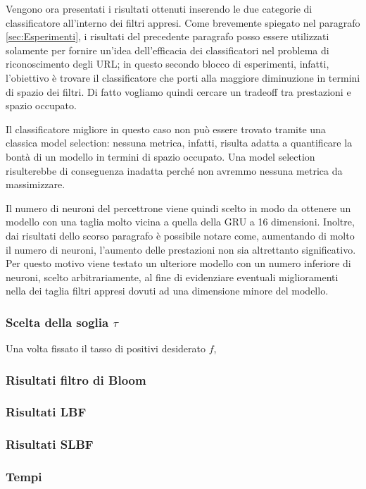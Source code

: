 \documentclass[../../main.tex]{subfiles}
\begin{document}
    Vengono ora presentati i risultati ottenuti inserendo le due categorie di classificatore all'interno dei filtri appresi. Come brevemente spiegato nel paragrafo \ref{sec:Esperimenti}, i risultati del precedente paragrafo posso essere utilizzati solamente per fornire un'idea dell'efficacia dei classificatori nel problema di riconoscimento degli URL; in questo secondo blocco di esperimenti, infatti, l'obiettivo è trovare il classificatore che porti alla maggiore diminuzione in termini di spazio dei filtri. Di fatto vogliamo quindi cercare un tradeoff tra prestazioni e spazio occupato.

    Il classificatore migliore in questo caso non può essere trovato tramite una classica model selection: nessuna metrica, infatti, risulta adatta a quantificare la bontà di un modello in termini di spazio occupato. Una model selection risulterebbe di conseguenza inadatta perché non avremmo nessuna metrica da massimizzare.

    Il numero di neuroni del percettrone viene quindi scelto in modo da ottenere un modello con una taglia molto vicina a quella della GRU a 16 dimensioni. Inoltre, dai risultati dello scorso paragrafo è possibile notare come, aumentando di molto il numero di neuroni, l'aumento delle prestazioni non sia altrettanto significativo. Per questo motivo viene testato un ulteriore modello con un numero inferiore di neuroni, scelto arbitrariamente, al fine di evidenziare eventuali miglioramenti nella dei taglia filtri appresi dovuti ad una dimensione minore del modello.
    
    \subsubsection{Scelta della soglia $\tau$}
    Una volta fissato il tasso di positivi desiderato $f$, 

    \subsubsection{Risultati filtro di Bloom}

    \subsubsection{Risultati LBF}

    \subsubsection{Risultati SLBF}

    \subsubsection{Tempi}
\end{document}
